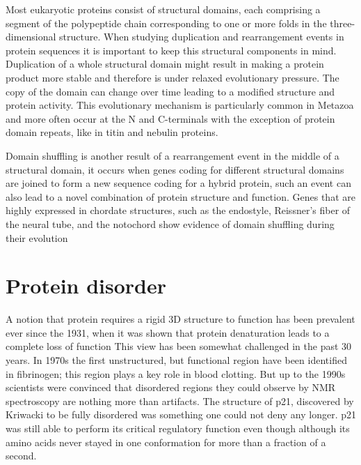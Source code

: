 \documentclass[11pt, a4paper,oneside]{report}
\begin{document}
Most eukaryotic proteins consist of structural domains, each comprising a segment of the polypeptide chain corresponding to one or more folds in the three-dimensional structure.
 When studying duplication and rearrangement events in protein sequences it is important to keep this structural components in mind. Duplication of a whole structural domain might result in making a protein product more stable and therefore is under relaxed evolutionary pressure. The copy of the domain can change over time leading to a modified structure and protein activity. This evolutionary mechanism is particularly common in Metazoa and more often occur at the N and C-terminals with the exception of protein domain repeats\cite{Bjorklund2006,Bjorklund2005}, like in titin\cite{Higgins1994} and nebulin\cite{Bjorklund2010} proteins. 

 Domain shuffling is another result of a rearrangement event in the middle of a structural domain, it occurs when genes coding for different structural domains are joined  to form a new sequence coding for a hybrid protein, such an event can also lead to a novel combination of protein structure and function. Genes that are highly expressed in chordate structures, such as the endostyle, Reissner's fiber of the neural tube, and the notochord show evidence of domain shuffling during their evolution\cite{Kawashima2009}
 
\section{Protein disorder}
A notion that protein requires a rigid 3D structure to function has been prevalent ever since the 1931, when it was shown that protein denaturation leads to a complete loss of function\cite{Wu1995} This view has been somewhat challenged in the past 30 years. In 1970s the first unstructured, but functional region have been identified in fibrinogen; this region plays a key role in blood clotting\cite{Doolittle1973}. But up to the 1990s scientists were convinced that disordered regions they could observe by NMR spectroscopy are nothing more than artifacts. The structure of p21, discovered by Kriwacki to be fully disordered was something one could not deny any longer.  p21 was still able to perform its critical regulatory function even though although its amino acids never stayed in one conformation for more than a fraction of a second.
 
\end{document}
